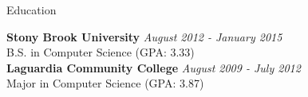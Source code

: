 \documentclass{resume} %
\begin{document}
\begin{rSection}{Education}

{\bf Stony Brook University} \hfill {\em August 2012 - January 2015} \\ 
B.S. in Computer Science (GPA: 3.33)  \\
{\bf Laguardia Community College} \hfill {\em August 2009 - July 2012} \\ 
Major in Computer Science (GPA: 3.87) 
\end{rSection}
\end{document}
